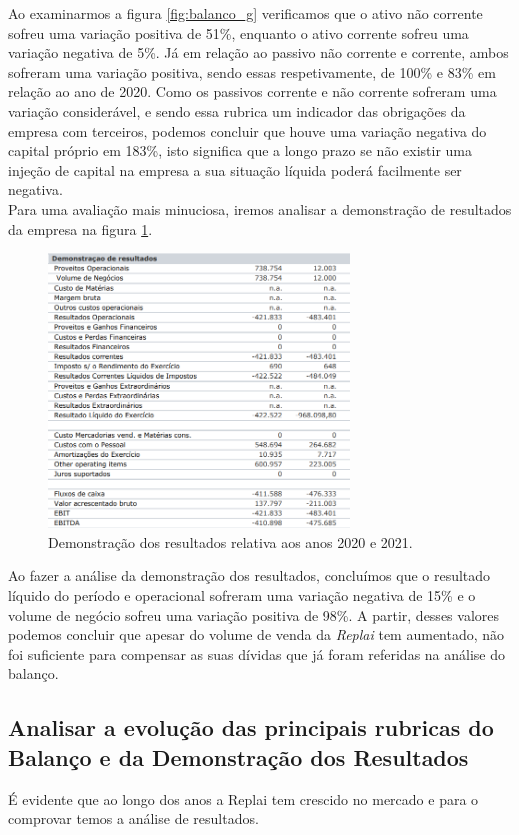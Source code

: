 Ao examinarmos a figura \ref{fig:balanco_g} verificamos que o ativo não corrente sofreu uma variação positiva de 51\%, enquanto o ativo corrente sofreu uma variação negativa de 5\%. Já em relação ao passivo não corrente e corrente, ambos sofreram uma variação positiva, sendo essas respetivamente, de 100\% e 83\% em relação ao ano de 2020. Como os passivos corrente e não corrente sofreram uma variação considerável, e sendo essa rubrica um indicador das obrigações da empresa com terceiros, podemos concluir que houve uma variação negativa do capital próprio em 183\%, isto significa que a longo prazo se não existir uma injeção de capital na empresa a sua situação líquida poderá facilmente ser negativa.\\

Para uma avaliação mais minuciosa, iremos analisar a demonstração de resultados da empresa na figura \ref{demostracao}.
\begin{figure}[ht]
    \centering
    \includegraphics[width=8cm]{images/demostracao_resultados.png}
    \caption{Demonstração dos resultados relativa aos anos 2020 e 2021.}
    \label{demostracao}
\end{figure}

Ao fazer a análise da demonstração dos resultados, concluímos que o resultado líquido do período e operacional sofreram uma variação negativa de 15\% e o volume de negócio sofreu uma variação positiva de 98\%. A partir, desses valores podemos concluir que apesar do volume de venda da \textit{Replai} tem aumentado, não foi suficiente para compensar as suas dívidas que já foram referidas na análise do balanço.

\subsection{Analisar a evolução das principais rubricas do Balanço e da Demonstração dos Resultados}
É evidente que ao longo dos anos a Replai tem crescido no mercado e para o comprovar temos a análise de resultados. 


